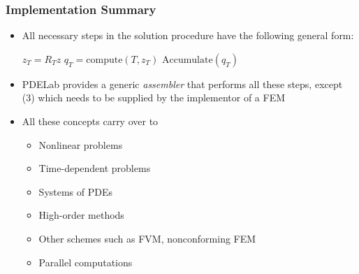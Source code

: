 \documentclass[ignorenonframetext,11pt]{beamer}
\theoremstyle{definition}
\begin{document}
\begin{frame}
\frametitle{Implementation Summary}
\begin{itemize}
\item All necessary steps in the solution procedure have the following general form:
\begin{algorithmic}[1]
 
\State $z_T = R_T z$ 
\State $q_T=\text{compute}(T,z_T)$ 
\State $\text{Accumulate}(q_T)$ 
\EndFor
\end{algorithmic}
\item PDELab provides a generic {\em assembler} that performs all these steps,
except (3) which needs to be supplied by the implementor of a FEM
\item All these concepts carry over to
\begin{itemize}
\item Nonlinear problems
\item Time-dependent problems
\item Systems of PDEs
\item High-order methods
\item Other schemes such as FVM, nonconforming FEM
\item Parallel computations
\end{itemize}
\end{itemize}
\end{frame}
\end{document}

